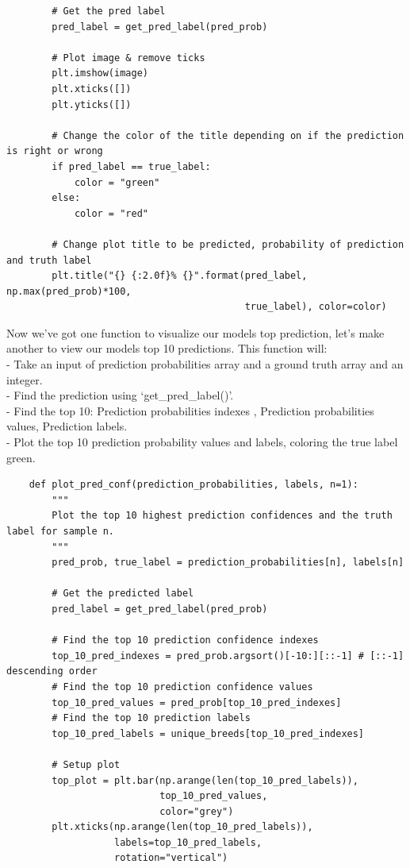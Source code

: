 \documentclass[11pt, a4paper]{article}
\begin{document}
\begin{spacing}{1.1}
\begin{lstlisting}
		# Get the pred label
		pred_label = get_pred_label(pred_prob)
		
		# Plot image & remove ticks
		plt.imshow(image)
		plt.xticks([])
		plt.yticks([])
		
		# Change the color of the title depending on if the prediction is right or wrong
		if pred_label == true_label:
			color = "green"
		else:
			color = "red"
		
		# Change plot title to be predicted, probability of prediction and truth label
		plt.title("{} {:2.0f}% {}".format(pred_label, np.max(pred_prob)*100,
		                                  true_label), color=color)	\end{lstlisting} \vspace*{1mm}
	Now we've got one function to visualize our models top prediction, let's make another to view our models top 10 predictions. This function will: \vspace*{1mm} \\
	\hspace*{3mm} - Take an input of prediction probabilities array and a ground truth array and an integer. \\
	\hspace*{3mm} - Find the prediction using `get\_pred\_label()'. \\
	\hspace*{3mm} - Find the top 10: Prediction probabilities indexes , Prediction probabilities values, Prediction labels. \\
	\hspace*{3mm} - Plot the top 10 prediction probability values and labels, coloring the true label green.
	\begin{lstlisting}
	def plot_pred_conf(prediction_probabilities, labels, n=1):
		"""
		Plot the top 10 highest prediction confidences and the truth label for sample n.
		"""
		pred_prob, true_label = prediction_probabilities[n], labels[n]
		
		# Get the predicted label
		pred_label = get_pred_label(pred_prob)
		
		# Find the top 10 prediction confidence indexes
		top_10_pred_indexes = pred_prob.argsort()[-10:][::-1] # [::-1] descending order
		# Find the top 10 prediction confidence values
		top_10_pred_values = pred_prob[top_10_pred_indexes]
		# Find the top 10 prediction labels
		top_10_pred_labels = unique_breeds[top_10_pred_indexes]
		
		# Setup plot
		top_plot = plt.bar(np.arange(len(top_10_pred_labels)),
		                   top_10_pred_values,
		                   color="grey")
		plt.xticks(np.arange(len(top_10_pred_labels)),
		           labels=top_10_pred_labels,
		           rotation="vertical")
		

\end{lstlisting}
\end{spacing}
\end{document}
